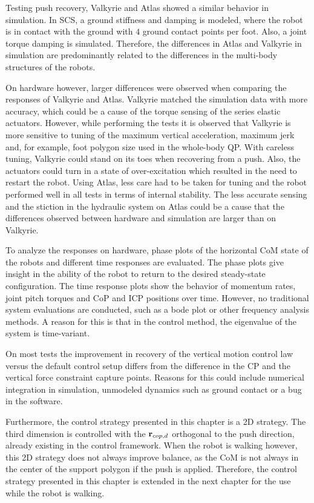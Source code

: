 Testing push recovery, Valkyrie and Atlas showed a similar behavior in simulation. In \ac{SCS}, a ground stiffness and damping is modeled, where the robot is in contact with the ground with $4$ ground contact points per foot. Also, a joint torque damping is simulated. Therefore, the differences in Atlas and Valkyrie in simulation are predominantly related to the differences in the multi-body structures of the robots.

On hardware however, larger differences were observed when comparing the responses of Valkyrie and Atlas. Valkyrie matched the simulation data with more accuracy, which could be a cause of the torque sensing of the series elastic actuators. However, while performing the tests it is observed that Valkyrie is more sensitive to tuning of the maximum vertical acceleration, maximum jerk and, for example, foot polygon size used in the whole-body \ac{QP}. With careless tuning, Valkyrie could stand on its toes when recovering from a push. Also, the actuators could turn in a state of over-excitation which resulted in the need to restart the robot. Using Atlas, less care had to be taken for tuning and the robot performed well in all tests in terms of internal stability. The less accurate sensing and the stiction in the hydraulic system on Atlas could be a cause that the differences observed between hardware and simulation are larger than on Valkyrie.

To analyze the responses on hardware, phase plots of the horizontal \ac{CoM} state of the robots and different time responses are evaluated. The phase plots give insight in the ability of the robot to return to the desired steady-state configuration. The time response plots show the behavior of momentum rates, joint pitch torques and \ac{CoP} and \ac{ICP} positions over time. However, no traditional system evaluations are conducted, such as a bode plot or other frequency analysis methods. A reason for this is that in the control method, the eigenvalue of the system is time-variant.

On most tests the improvement in recovery of the vertical motion control law versus the default control setup differs  from the difference in the \ac{CP} and the vertical force constraint capture points. Reasons for this could include numerical integration in simulation, unmodeled dynamics such as ground contact or a bug in the software.

Furthermore, the control strategy presented in this chapter is a \ac{2D} strategy. The third dimension is controlled with the $\mathbf{r}_{cop,d}$ orthogonal to the push direction, already existing in the control framework. When the robot is walking however, this \ac{2D} strategy does not always improve balance, as the \ac{CoM} is not always in the center of the support polygon if the push is applied. Therefore, the control strategy presented in this chapter is extended in the next chapter for the use while the robot is walking.



